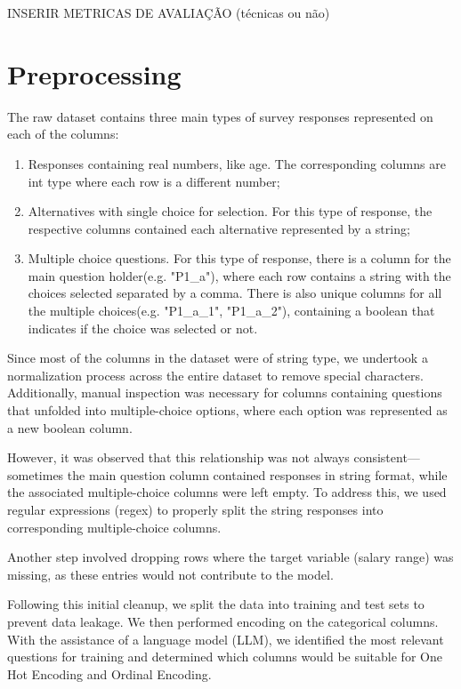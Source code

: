 \documentclass[conference]{IEEEtran}
\begin{document}
INSERIR METRICAS DE AVALIAÇÃO (técnicas ou não)

\section{Preprocessing}
The raw dataset contains three main types of survey responses represented on each of the columns:
\begin{enumerate}
    \item Responses containing real numbers, like age. The corresponding columns are int type where each row is a different number;
    \item Alternatives with single choice for selection. For this type of response, the respective columns contained each alternative represented by a string; 
    \item Multiple choice questions. For this type of response, there is a column for the main question holder(e.g. "P1\_a"), where each row contains a string with the choices selected separated by a comma. There is also unique columns for all the multiple choices(e.g. "P1\_a\_1", "P1\_a\_2"), containing a boolean that indicates if the choice was selected or not.
\end{enumerate}
Since most of the columns in the dataset were of string type, we undertook a normalization process across the entire dataset to remove special characters. Additionally, manual inspection was necessary for columns containing questions that unfolded into multiple-choice options, where each option was represented as a new boolean column. 

However, it was observed that this relationship was not always consistent—sometimes the main question column contained responses in string format, while the associated multiple-choice columns were left empty. To address this, we used regular expressions (regex) to properly split the string responses into corresponding multiple-choice columns.

Another step involved dropping rows where the target variable (salary range) was missing, as these entries would not contribute to the model.

Following this initial cleanup, we split the data into training and test sets to prevent data leakage. We then performed encoding on the categorical columns. With the assistance of a language model (LLM), we identified the most relevant questions for training and determined which columns would be suitable for One Hot Encoding and Ordinal Encoding.
\end{document}
